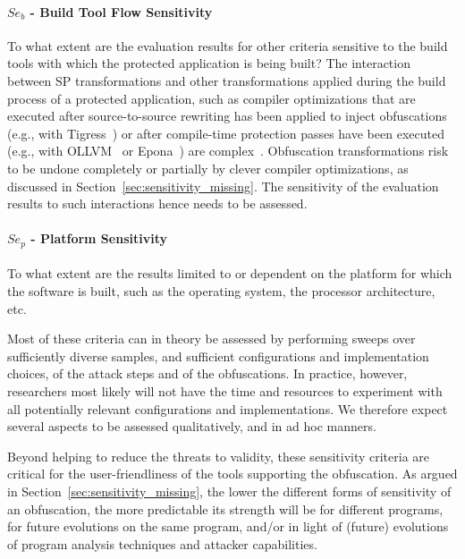 \paragraph{$Se_{b}$ - Build Tool Flow Sensitivity} To what extent are the evaluation results for other criteria sensitive to the build tools with which the protected application is being built? The interaction between SP transformations and other transformations applied during the build process of a protected application, such as compiler optimizations that are executed after source-to-source rewriting has been applied to inject obfuscations (e.g., with Tigress~\cite{tigress2023}) or after compile-time protection passes have been executed (e.g., with OLLVM~\cite{ollvm} or Epona~\cite{epona}) are complex~\cite{optimization}. Obfuscation transformations risk to be undone completely or partially by clever compiler optimizations, as discussed in Section~\ref{sec:sensitivity_missing}. The sensitivity of the evaluation results to such interactions hence needs to be assessed. 

\paragraph{$Se_{p}$ - Platform Sensitivity} To what extent are the results limited to or dependent on the platform for which the software is built, such as the operating system, the processor architecture, etc.

\vspace{0.2cm}

Most of these criteria can in theory be assessed by performing sweeps over sufficiently diverse samples, and sufficient configurations and implementation choices, of the attack steps and of the obfuscations. In practice, however, researchers most likely will not have the time and resources to experiment with all potentially relevant configurations and implementations. We therefore expect several aspects to be assessed qualitatively, and in ad hoc manners. 

Beyond helping to reduce the threats to validity, these sensitivity criteria are critical for the user-friendliness of the tools supporting the obfuscation. As argued in Section~\ref{sec:sensitivity_missing}, the lower the different forms of sensitivity of an obfuscation, the more predictable its strength will be for different programs, for future evolutions on the same program, and/or in light of (future) evolutions of program analysis techniques and attacker capabilities. 

